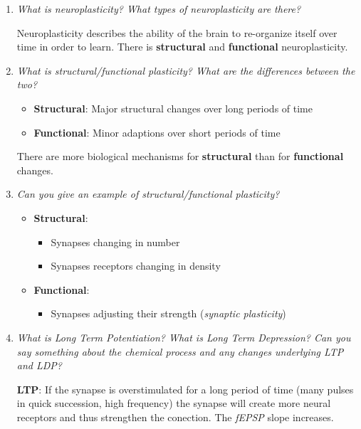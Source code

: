 \documentclass[
    fontsize      = 11pt,
    paper         = a4,
    twoside       = false,
    parskip       = half,
    pagesize      = false,
]{scrartcl}
\providecommand{\tightlist}{%
  \setlength{\itemsep}{0pt}\setlength{\parskip}{0pt}}
\begin{document}
\begin{enumerate}
\def\labelenumi{\arabic{enumi}.}
\item
  \emph{What is neuroplasticity? What types of neuroplasticity are
  there?}

  Neuroplasticity describes the ability of the brain to re-organize
  itself over time in order to learn. There is \textbf{structural} and
  \textbf{functional} neuroplasticity.
\item
  \emph{What is structural/functional plasticity? What are the
  differences between the two?}

  \begin{itemize}
  \tightlist
  \item
    \textbf{Structural}: Major structural changes over long periods of
    time
  \item
    \textbf{Functional}: Minor adaptions over short periods of time
  \end{itemize}

  There are more biological mechanisms for \textbf{structural} than for
  \textbf{functional} changes.
\item
  \emph{Can you give an example of structural/functional plasticity?}

  \begin{itemize}
  \tightlist
  \item
    \textbf{Structural}:

    \begin{itemize}
    \tightlist
    \item
      Synapses changing in number
    \item
      Synapses receptors changing in density
    \end{itemize}
  \item
    \textbf{Functional}:

    \begin{itemize}
    \tightlist
    \item
      Synapses adjusting their strength (\emph{synaptic plasticity})
    \end{itemize}
  \end{itemize}
\item
  \emph{What is Long Term Potentiation? What is Long Term Depression?
  Can you say something about the chemical process and any changes
  underlying LTP and LDP?}

  \textbf{LTP}: If the synapse is overstimulated for a long period of
  time (many pulses in quick succession, high frequency) the synapse
  will create more neural receptors and thus \glqq strengthen \grqq the
  conection. The \emph{fEPSP} slope increases.


\end{enumerate}
\end{document}
